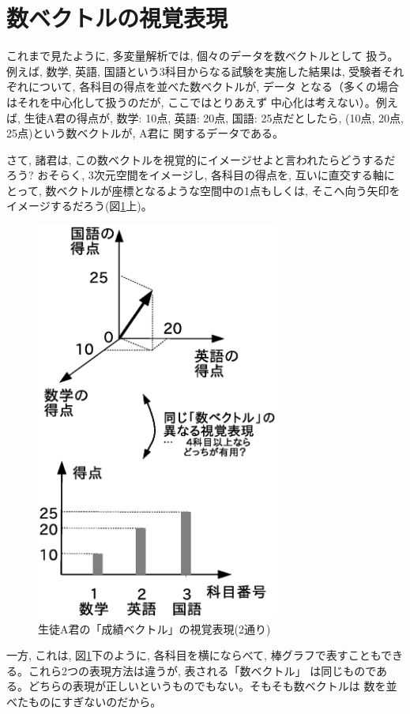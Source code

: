 \section{数ベクトルの視覚表現}

これまで見たように, 多変量解析では, 個々のデータを数ベクトルとして
扱う。例えば, 数学, 英語, 国語という3科目からなる試験を実施した結果は, 
受験者それぞれについて, 各科目の得点を並べた数ベクトルが, データ
となる（多くの場合はそれを中心化して扱うのだが, ここではとりあえず
中心化は考えない）。例えば, 生徒A君の得点が, 数学: 10点, 英語: 20点, 
国語: 25点だとしたら, (10点, 20点, 25点)という数ベクトルが, A君に
関するデータである。

さて, 諸君は, この数ベクトルを視覚的にイメージせよと言われたらどうするだろう?
おそらく, 3次元空間をイメージし, 各科目の得点を, 互いに直交する軸にとって, 
数ベクトルが座標となるような空間中の1点もしくは, そこへ向う矢印を
イメージするだろう(図\ref{fig:vect_visual2}上)。
\begin{figure}
    \centering
    \includegraphics[width=8cm]{vect_visual2.eps}
    \caption{生徒A君の「成績ベクトル」の視覚表現(2通り)\label{fig:vect_visual2}}
\end{figure}

一方, これは, 図\ref{fig:vect_visual2}下のように, 各科目を横にならべて, 
棒グラフで表すこともできる。これら2つの表現方法は違うが, 表される「数ベクトル」
は同じものである。どちらの表現が正しいというものでもない。そもそも数ベクトルは
数を並べたものにすぎないのだから。

